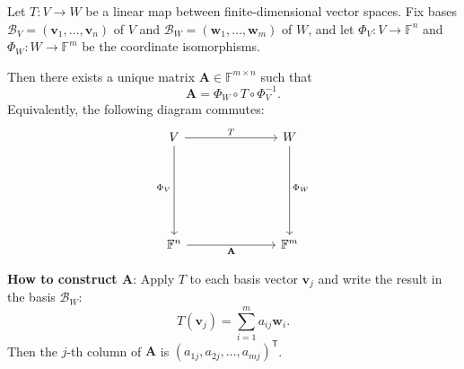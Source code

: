 \begin{theorem}\label{thm:fundamental-linalg}
  Let $T : V \to W$ be a linear map between finite-dimensional vector spaces.
  Fix bases $\mathcal{B}_V = (\mathbf{v}_1,\dots,\mathbf{v}_n)$ of $V$ and $\mathcal{B}_W = (\mathbf{w}_1,\dots,\mathbf{w}_m)$ of $W$,
  and let $\Phi_V : V \to \mathbb{F}^n$ and $\Phi_W : W \to \mathbb{F}^m$ be the coordinate isomorphisms.

  Then there exists a unique matrix $\mathbf{A} \in \mathbb{F}^{m \times n}$ such that
  \begin{equation}\label{eq:matrix-formula}
    \mathbf{A} = \Phi_W \circ T \circ \Phi_V^{-1}.
  \end{equation}
  Equivalently, the following diagram commutes:
  \[
    \begin{tikzcd}[row sep=2.5cm, column sep=2.5cm]
      V \arrow[r, "T"] \arrow[d, swap, "\Phi_V" {yshift=2pt}]
      & W \arrow[d, "\Phi_W" {yshift=2pt}] \\
      \mathbb{F}^n \arrow[r, swap, "\mathbf{A}"]
      & \mathbb{F}^m
    \end{tikzcd}
  \]

  \textbf{How to construct $\mathbf{A}$}: Apply $T$ to each basis vector $\mathbf{v}_j$ and write the result in the basis $\mathcal{B}_W$:
  \begin{equation}\label{eq:matrix-columns}
    T(\mathbf{v}_j) = \sum_{i=1}^{m} a_{ij} \mathbf{w}_i.
  \end{equation}
  Then the $j$-th column of $\mathbf{A}$ is $(a_{1j}, a_{2j}, \dots, a_{mj})^{\mathsf{T}}$.
\end{theorem}

